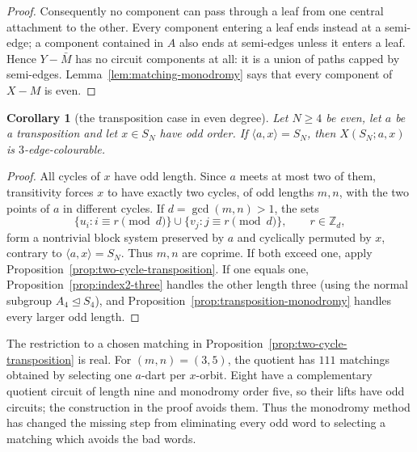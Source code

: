 \documentclass[11pt,a4paper]{article}
\newtheorem{corollary}[theorem]{Corollary}
\theoremstyle{definition}
\theoremstyle{remark}
\newcommand{\ZZ}{\mathbb{Z}}
\newcommand{\X}[3]{X(#1;#2,#3)}
\begin{document}
\begin{proof}
Consequently no component can pass through a leaf from one central attachment to the other.  Every component entering a leaf ends instead at a semi-edge; a component contained in $A$ also ends at semi-edges unless it enters a leaf.  Hence $Y-\bar M$ has no circuit components at all: it is a union of paths capped by semi-edges.  Lemma~\ref{lem:matching-monodromy} says that every component of $X-M$ is even.
\end{proof}

\begin{corollary}[the transposition case in even degree]\label{cor:even-symmetric-transposition}
Let $N\ge4$ be even, let $a$ be a transposition and let $x\in S_N$ have odd order.  If $\langle a,x\rangle=S_N$, then $\X{S_N}{a}{x}$ is $3$-edge-colourable.
\end{corollary}
\begin{proof}
All cycles of $x$ have odd length.  Since $a$ meets at most two of them, transitivity forces $x$ to have exactly two cycles, of odd lengths $m,n$, with the two points of $a$ in different cycles.  If $d=\gcd(m,n)>1$, the sets
\[
 \{u_i:i\equiv r\pmod d\}\cup\{v_j:j\equiv r\pmod d\},
 \qquad r\in\ZZ_d,
\]
form a nontrivial block system preserved by $a$ and cyclically permuted by $x$, contrary to $\langle a,x\rangle=S_N$.  Thus $m,n$ are coprime.  If both exceed one, apply Proposition~\ref{prop:two-cycle-transposition}.  If one equals one, Proposition~\ref{prop:index2-three} handles the other length three (using the normal subgroup $A_4\trianglelefteq S_4$), and Proposition~\ref{prop:transposition-monodromy} handles every larger odd length.
\end{proof}

The restriction to a chosen matching in Proposition~\ref{prop:two-cycle-transposition} is real.  For $(m,n)=(3,5)$, the quotient has $111$ matchings obtained by selecting one $a$-dart per $x$-orbit.  Eight have a complementary quotient circuit of length nine and monodromy order five, so their lifts have odd circuits; the construction in the proof avoids them.  Thus the monodromy method has changed the missing step from eliminating every odd word to selecting a matching which avoids the bad words.
\end{document}
